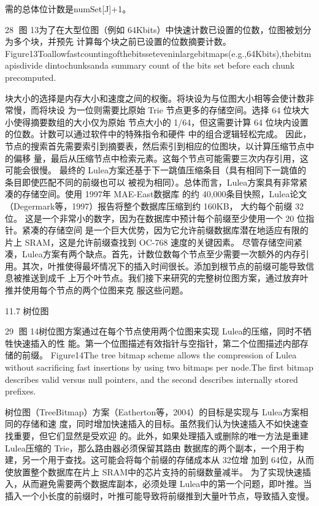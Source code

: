 需的总体位计数是numSet[J]+1。




                                                       28
图 13为了在大型位图（例如 64Kbits）中快速计数已设置的位数，位图被划分为多个块，并预先
计算每个块之前已设置的位数摘要计数。
Figure13Toallowfastcountingofthebitsseteveninlargebitmaps(e.g.,64Kbits),thebitmapisdivide
dintochunksanda summary count of the bits set before each chunk precomputed.



块大小的选择是内存大小和速度之间的权衡。将块设为与位图大小相等会使计数非常慢，而将块设
为一位则需要比原始 Trie 节点更多的存储空间。选择 64 位块大小使得摘要数组的大小仅为原始
节点大小的 1/64，但这需要计算 64 位块内设置的位数。计数可以通过软件中的特殊指令和硬件
中的组合逻辑轻松完成。
因此，节点的搜索首先需要索引到摘要表，然后索引到相应的位图块，以计算压缩节点中的偏移
量，最后从压缩节点中检索元素。这每个节点可能需要三次内存引用，这可能会很慢。
最终的 Lulea方案还基于下一跳值压缩条目（具有相同下一跳值的条目即使匹配不同的前缀也可以
被视为相同）。总体而言，Lulea方案具有非常紧凑的存储空间。使用 1997年 MAE-East数据库
的约 40,000条目快照，Lulea论文（Degermark等，1997）报告将整个数据库压缩到约 160KB，
大约每个前缀 32位。
这是一个非常小的数字，因为在数据库中预计每个前缀至少使用一个 20 位指针。紧凑的存储空间
是一个巨大优势，因为它允许前缀数据库潜在地适应有限的片上 SRAM，这是允许前缀查找到
OC-768 速度的关键因素。
尽管存储空间紧凑，Lulea方案有两个缺点。首先，计数位数每个节点至少需要一次额外的内存引
用。其次，叶推使得最坏情况下的插入时间很长。添加到根节点的前缀可能导致信息被推送到成千
上万个叶节点。我们接下来研究的完整树位图方案，通过放弃叶推并使用每个节点的两个位图来克
服这些问题。



11.7 树位图


                                                                                       29
图 14树位图方案通过在每个节点使用两个位图来实现 Lulea的压缩，同时不牺牲快速插入的性
能。第一个位图描述有效指针与空指针，第二个位图描述内部存储的前缀。
Figure14The tree bitmap scheme allows the compression of Lulea without sacrificing fast
insertions by using two bitmaps per node.The first bitmap describes valid versus null
pointers, and the second describes internally stored prefixes.

树位图（TreeBitmap）方案（Eatherton等，2004）的目标是实现与 Lulea方案相同的存储和速
度，同时增加快速插入的目标。虽然我们认为快速插入不如快速查找重要，但它们显然是受欢迎
的。此外，如果处理插入或删除的唯一方法是重建 Lulea压缩的 Trie，那么路由器必须保留其路由
数据库的两个副本，一个用于构建，另一个用于查找。这可能会将每个前缀的存储成本从 32位增
加到 64位，从而使放置整个数据库在片上 SRAM中的芯片支持的前缀数量减半。
为了实现快速插入，从而避免需要两个数据库副本，必须处理 Lulea中的第一个问题，即叶推。当
插入一个小长度的前缀时，叶推可能导致将前缀推到大量叶节点，导致插入变慢。

